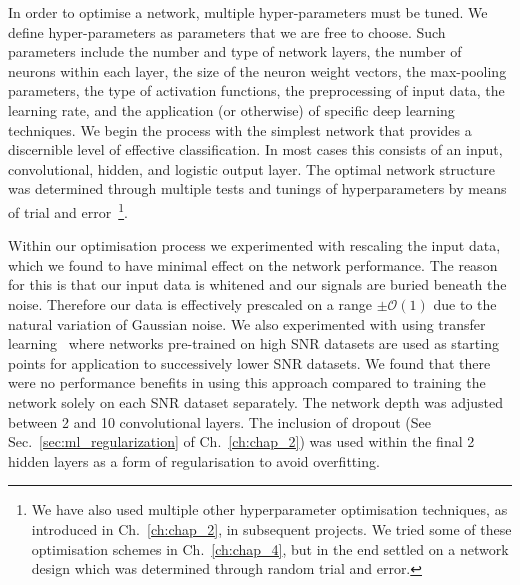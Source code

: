 %
%
In order to optimise a network, multiple hyper-parameters must be tuned. 
We define hyper-parameters as parameters that we are free to 
choose. Such parameters include the number and type of network layers, 
the number of neurons within each layer, the size of the neuron 
weight vectors, the max-pooling parameters, the type of activation 
functions, the preprocessing of input data, the learning rate, and the 
application (or otherwise) of specific deep learning techniques. We 
begin the process with the simplest network that provides a 
discernible level of effective classification. In most 
cases this consists of an input, convolutional, hidden, and 
logistic output layer. The optimal network structure was 
determined through multiple tests and tunings of hyperparameters by 
means of trial and error~\footnote{We have also used multiple other 
hyperparameter optimisation techniques, as introduced in Ch.~\ref{ch:chap_2}, 
in subsequent projects. We tried some of these optimisation schemes 
in Ch.~\ref{ch:chap_4}, but in the end settled on a network design which 
was determined through random trial and error.}.

%
%
Within our optimisation process we experimented with rescaling the input 
data, which we found to have minimal effect on the network performance. The 
reason for this is that our input data is whitened and our 
signals are buried beneath the noise. Therefore our data is effectively 
prescaled on a range $\pm\mathcal{O}(1)$ due to the natural 
variation of Gaussian noise. We also experimented with using 
transfer learning~\cite{5288526} where networks pre-trained on 
high \ac{SNR} datasets are used as starting points for application to 
successively lower \ac{SNR} datasets. We found that there were no 
performance benefits in using this approach compared to training the 
network solely on each \ac{SNR} dataset separately. The network depth was 
adjusted between 2 and 10 convolutional layers. The inclusion of 
dropout (See Sec.~\ref{sec:ml_regularization} of Ch.~\ref{ch:chap_2})
was used within the final 2 hidden layers as a form of 
regularisation to avoid overfitting.

